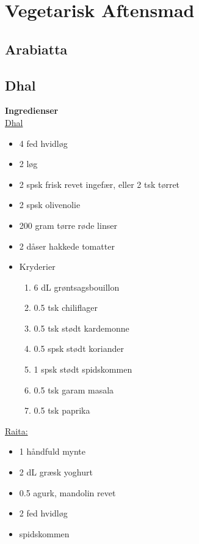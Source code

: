 \documentclass{book}
\begin{document}
{\chapter{Vegetarisk Aftensmad}
\section{Arabiatta}
\begin{minipage}[t]{0.5\textwidth}
\end{minipage}
\begin{minipage}[t]{0.5\textwidth}
\end{minipage}
\newpage \section{Dhal}
\begin{minipage}[t]{0.5\textwidth}
\textbf{Ingredienser} \\
\underline{Dhal}
\begin{itemize}
    \item 4 fed hvidløg
    \item 2 løg
    \item 2 spsk frisk revet ingefær, eller 2 tsk tørret
    \item 2 spsk olivenolie
    \item 200 gram tørre røde linser
    \item 2 dåser hakkede tomatter
    \item Kryderier
    \begin{enumerate}
        \item 6 dL grøntsagsbouillon
        \item 0.5 tsk chiliflager
        \item 0.5 tsk stødt kardemonne
        \item 0.5 spsk stødt koriander
        \item 1 spsk stødt spidskommen
        \item 0.5 tsk garam masala
        \item 0.5 tsk paprika
    \end{enumerate}
    \end{itemize} 
\underline{Raita:}
\begin{itemize} 
    \item 1 håndfuld mynte
    \item 2 dL græsk yoghurt
    \item 0.5 agurk, mandolin revet
    \item 2 fed hvidløg
    \item spidskommen

\end{itemize}
\end{minipage}}
\end{document}
